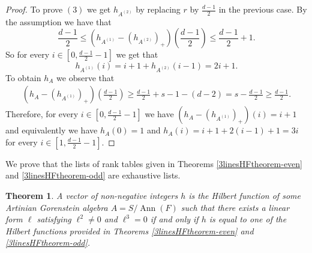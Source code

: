 \documentclass[12pt]{amsart}
\numberwithin{equation}{section}
\theoremstyle{plain} \newtheorem{theorem}{Theorem}[section]
\theoremstyle{definition} \newtheorem{definition}[theorem]{Definition}
\DeclareMathOperator{\ann}{Ann}\DeclareMathOperator{\Char}{char}
\begin{document}
\begin{proof}
To prove $(3)$ we get $h_{A^{(2)}}$ by replacing $r$ by $\frac{d-1}{2}$ in the previous case. By the assumption we have that 
$$
\frac{d-1}{2}\leq (h_{A^{(1)}}-(h_{A^{(2)}})_+)(\frac{d-1}{2})\leq \frac{d-1}{2}+1.
$$
So for every $i\in [0,\frac{d-1}{2}-1]$ we get that $$h_{A^{(1)}}(i)=i+1+h_{A^{(2)}}(i-1)=2i+1.$$
To obtain $h_A$ we observe that
\begin{align*}
(h_{A}-(h_{A^{(1)}})_+)(\frac{d-1}{2}) \geq \frac{d-1}{2}+s-1-(d-2)
=s-\frac{d-1}{2}\geq \frac{d-1}{2}.
\end{align*}
Therefore, for every $i\in [0,\frac{d-1}{2}-1]$ we have $(h_{A}-(h_{A^{(1)}})_+)(i)=i+1$ and equivalently we have $h_A(0)=1$ and $h_A(i)=i+1+2(i-1)+1=3i$ for every $i\in [1,\frac{d-1}{2}-1]$.
\end{proof}
We prove that the lists of rank tables given in Theorems \ref{3linesHFtheorem-even} and \ref{3linesHFtheorem-odd} are exhaustive lists. 
\begin{theorem}\label{allHF´sPossible-even}
A vector of non-negative integers $h$ is the Hilbert function of some Artinian    Gorenstein algebra  $A=S/\ann(F)$ such that there exists a linear form $\ell$ satisfying $ \ell^2\neq 0$ and $\ell^3=0$ if and only if $h$ is equal to one of the Hilbert functions provided in Theorems \ref{3linesHFtheorem-even} and \ref{3linesHFtheorem-odd}.
\end{theorem}
\end{document}
